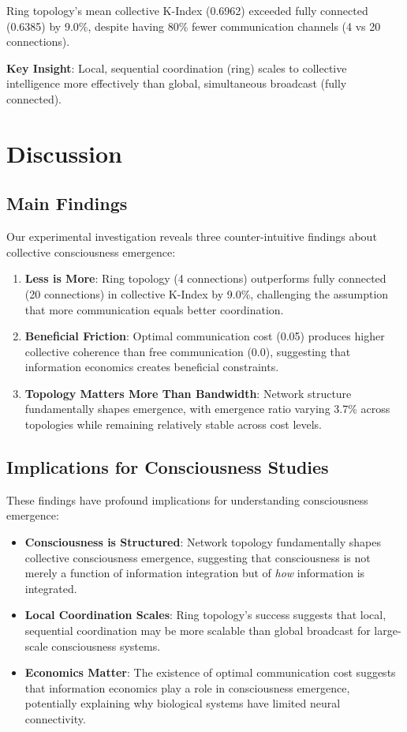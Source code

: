 \documentclass[10pt,letterpaper]{article}
\begin{document}
Ring topology's mean collective K-Index (0.6962) exceeded fully connected (0.6385) by 9.0\%, despite having 80\% fewer communication channels (4 vs 20 connections).

\textbf{Key Insight}: Local, sequential coordination (ring) scales to collective intelligence more effectively than global, simultaneous broadcast (fully connected).

\section*{Discussion}

\subsection*{Main Findings}
Our experimental investigation reveals three counter-intuitive findings about collective consciousness emergence:

\begin{enumerate}
\item \textbf{Less is More}: Ring topology (4 connections) outperforms fully connected (20 connections) in collective K-Index by 9.0\%, challenging the assumption that more communication equals better coordination.
\item \textbf{Beneficial Friction}: Optimal communication cost (0.05) produces higher collective coherence than free communication (0.0), suggesting that information economics creates beneficial constraints.
\item \textbf{Topology Matters More Than Bandwidth}: Network structure fundamentally shapes emergence, with emergence ratio varying 3.7\% across topologies while remaining relatively stable across cost levels.
\end{enumerate}

\subsection*{Implications for Consciousness Studies}
These findings have profound implications for understanding consciousness emergence:

\begin{itemize}
\item \textbf{Consciousness is Structured}: Network topology fundamentally shapes collective consciousness emergence, suggesting that consciousness is not merely a function of information integration but of \textit{how} information is integrated.
\item \textbf{Local Coordination Scales}: Ring topology's success suggests that local, sequential coordination may be more scalable than global broadcast for large-scale consciousness systems.
\item \textbf{Economics Matter}: The existence of optimal communication cost suggests that information economics play a role in consciousness emergence, potentially explaining why biological systems have limited neural connectivity.
\end{itemize}
\end{document}
